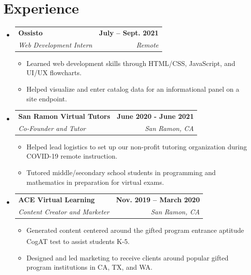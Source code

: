 \documentclass[letterpaper,11pt]{article}
\makeatletter
\newcommand{\resumeItem}[1]{
  \item\small{
    {#1 \vspace{-2pt}}
  }
}
\newcommand{\resumeSubheading}[4]{
  \vspace{-2pt}\item
    \begin{tabular*}{1.0\textwidth}[t]{l@{\extracolsep{\fill}}r}
      \textbf{#1} & \textbf{\small #2} \\
      \textit{\small#3} & \textit{\small #4} \\
    \end{tabular*}\vspace{-7pt}
}
\newcommand{\resumeSubHeadingListStart}{\begin{itemize}[leftmargin=0.0in, label={}]}
\newcommand{\resumeSubHeadingListEnd}{\end{itemize}}
\newcommand{\resumeItemListStart}{\begin{itemize}}
\newcommand{\resumeItemListEnd}{\end{itemize}\vspace{-5pt}}
\makeatother
\begin{document}
\section{Experience}
\resumeSubHeadingListStart

\resumeSubheading
{Ossisto}{July -- Sept. 2021}
{Web Development Intern}{Remote}
\resumeItemListStart
\resumeItem{Learned web development skills through HTML/CSS, JavaScript, and UI/UX flowcharts.}
\resumeItem{Helped visualize and enter catalog data for an informational panel on a site endpoint.}
\resumeItemListEnd

\resumeSubheading
{San Ramon Virtual Tutors}{June 2020 - June 2021}
{Co-Founder and Tutor}{San Ramon, CA}
\resumeItemListStart
\resumeItem{Helped lead logistics to set up our non-profit tutoring organization during COVID-19 remote instruction.}
\resumeItem{Tutored middle/secondary school students in programming and mathematics in preparation for virtual exams.}
\resumeItemListEnd

\resumeSubheading
{ACE Virtual Learning}{Nov. 2019 -- March 2020}
{Content Creator and Marketer}{San Ramon, CA}
\resumeItemListStart
\resumeItem{Generated content centered around the gifted program entrance aptitude CogAT\textsuperscript{\textregistered} test to assist students K-5.}
\resumeItem{Designed and led marketing to receive clients around popular gifted program institutions in CA, TX, and WA.}
\resumeItemListEnd

\resumeSubHeadingListEnd
\vspace{-15pt}

\end{document}

